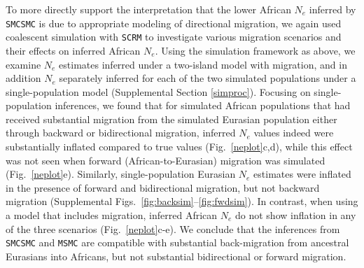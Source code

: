 To more directly support the interpretation that the lower African $N_e$ inferred by {\tt SMCSMC} is due to appropriate modeling of directional migration, we again used coalescent simulation with {\tt SCRM} to investigate various migration scenarios and their effects on inferred African $N_e$. Using the simulation framework as above, we examine $N_e$ estimates inferred under a two-island model with migration, and in addition $N_e$ separately inferred for each of the two simulated populations under a single-population model (Supplemental Section \ref{simproc}).  Focusing on single-population inferences, we found that for simulated African populations that had received substantial migration from the simulated Eurasian population either through backward or bidirectional migration, inferred $N_e$ values indeed were substantially inflated compared to true values (Fig.\ \ref{neplot}c,d), while this effect was not seen when forward (African-to-Eurasian) migration was simulated (Fig.\ \ref{neplot}e).  
Similarly, single-population Eurasian $N_e$ estimates were inflated in the presence of forward and bidirectional migration, but not backward migration (Supplemental Figs.\ \ref{fig:backsim}--\ref{fig:fwdsim}).
In contrast, when using a model that includes migration, inferred African $N_e$ do not show inflation in any of the three scenarios (Fig.\ \ref{neplot}c-e). We conclude that the inferences from {\tt SMCSMC} and {\tt MSMC} are compatible with substantial back-migration from ancestral Eurasians into Africans, but not substantial bidirectional or forward migration.

